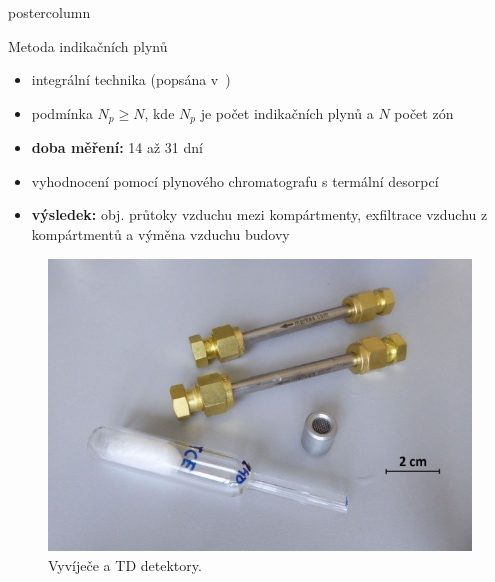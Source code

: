 \documentclass{beamer}
\begin{document}
\begin{frame}
\begin{columns}
\begin{column}{.43\textwidth}
\begin{beamercolorbox}[center]{postercolumn}
\begin{minipage}{.98\textwidth}
{\begin{myblock}{Metoda indikačních plynů}
            \begin{itemize}
                \item integrální technika (popsána v~\cite{metodika})
                \item podmínka $N_p\geq N$, kde $N_p$ je počet indikačních plynů a $N$ počet zón
                \item \textbf{doba měření:} 14 až 31 dní
                \item vyhodnocení pomocí plynového chromatografu s termální desorpcí
                \item \textbf{výsledek:} obj. průtoky vzduchu mezi kompártmenty, exfiltrace vzduchu z kompártmentů a výměna vzduchu budovy
            \end{itemize} 
            \vspace{1em}
    \begin{minipage}{.5\textwidth}
        \begin{figure}
            \centering
            \includegraphics[width=.9\textwidth]{podklady/vyvijec_TDdetektory.jpg}
            \caption{Vyvíječe a TD detektory.}
            \label{fig:vyvijec}
        \end{figure}
    \end{minipage}
    \begin{minipage}{.5\textwidth}
        \begin{figure}
            \centering

\end{figure}
\end{minipage}
\end{myblock}}
\end{minipage}
\end{beamercolorbox}
\end{column}
\end{columns}
\end{frame}
\end{document}
